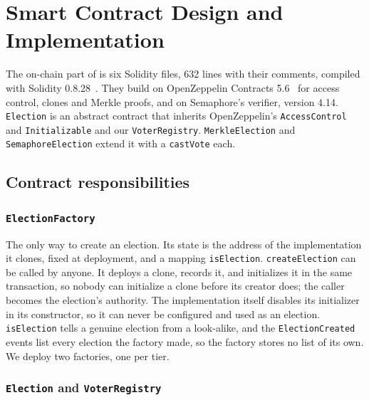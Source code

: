 \section{Smart Contract Design and Implementation}\label{sec:contracts}

The on-chain part of \projectname{} is six Solidity files, 632 lines with
their comments, compiled with Solidity 0.8.28~\cite{solidity}. They build on
OpenZeppelin Contracts 5.6~\cite{openzeppelin} for access control, clones and
Merkle proofs, and on Semaphore's verifier, version 4.14. \texttt{Election} is an abstract contract that inherits OpenZeppelin's
\texttt{AccessControl} and \texttt{Initializable} and our
\texttt{VoterRegistry}. \texttt{MerkleElection} and \texttt{SemaphoreElection}
extend it with a \texttt{castVote} each.

\subsection{Contract responsibilities}

\subsubsection*{\texttt{ElectionFactory}}

The only way to create an election. Its state is the address of the
implementation it clones, fixed at deployment, and a mapping
\texttt{isElection}.
\texttt{createElection} can be called by anyone. It deploys a clone, records
it, and initializes it in the same transaction, so nobody can initialize a
clone before its creator does; the caller becomes the election's authority.
The implementation itself disables its initializer in its constructor, so it
can never be configured and used as an election. \texttt{isElection} tells a
genuine election from a look-alike, and the \texttt{ElectionCreated} events
list every election the factory made, so the factory stores no list of its
own. We deploy two factories, one per tier.

\subsubsection*{\texttt{Election} and \texttt{VoterRegistry}}

